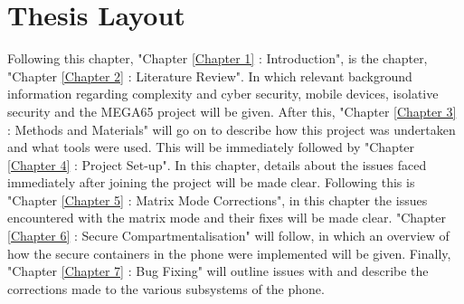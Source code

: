 \section{Thesis Layout}

\label{Ch1 Sec3}

Following this chapter, "Chapter \ref{Chapter 1} : Introduction", is the chapter, "Chapter \ref{Chapter 2} : Literature Review". In which relevant background information regarding complexity and cyber security, mobile devices, isolative security and the MEGA65 project will be given. After this, "Chapter \ref{Chapter 3} : Methods and Materials" will go on to describe how this project was undertaken and what tools were used. This will be immediately followed by "Chapter \ref{Chapter 4} : Project Set-up". In this chapter, details about the issues faced immediately after joining the project will be made clear. Following this is "Chapter \ref{Chapter 5} : Matrix Mode Corrections", in this chapter the issues encountered with the matrix mode and their fixes will be made clear. "Chapter \ref{Chapter 6} : Secure Compartmentalisation" will follow, in which an overview of how the secure containers in the phone were implemented will be given. Finally, "Chapter \ref{Chapter 7} : Bug Fixing" will outline issues with and describe the corrections made to the various subsystems of the phone.

